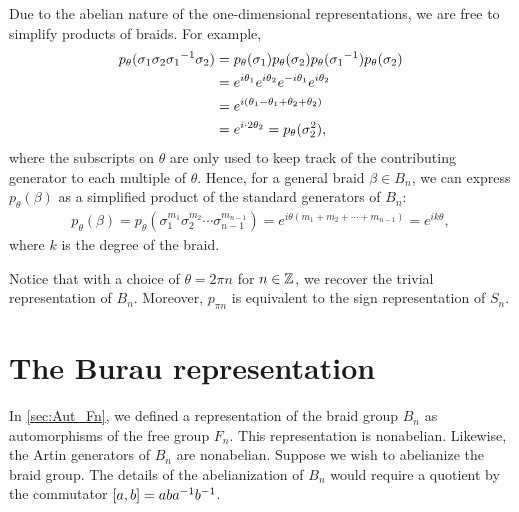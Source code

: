 Due to the abelian nature of the one-dimensional representations, we are free to simplify products of braids. For example,
\begin{align}
    \begin{split}        
    p_\theta(\sigma_1\sigma_{2}{ \sigma_1 }^{-1}\sigma_2) &= p_\theta(\sigma_1)p_\theta(\sigma_{2})p_\theta({ \sigma_1 }^{-1})p_\theta(\sigma_2) \\
    &= e^{i\theta_1}e^{i\theta_2}e^{-i\theta_{1}}e^{i\theta_2} \\
    &= e^{i\left( \theta_1-\theta_1 + \theta_2 + \theta_2 \right)} \\
    &= e^{i\cdot 2\theta_2} = p_\theta(\sigma_2^2),
    \end{split}
\end{align}
where the subscripts on $\theta$ are only used to keep track of the contributing generator to each multiple of $\theta$. Hence, for a general braid $\beta\in B_n$, we can express $p_\theta(\beta)$ as a simplified product of the standard generators of $B_n$:
\begin{align}
    p_\theta(\beta) = p_\theta(\sigma_{1}^{m_1}\sigma_{2}^{m_2}\cdots\sigma_{n-1}^{m_{n-1}}) = e^{i\theta(m_1+m_2+\cdots+m_{n-1})} = e^{ik\theta},
\end{align}
where $k$ is the degree of the braid.

Notice that with a choice of $\theta=2\pi n$ for $n\in\mathbb{Z}$, we recover the trivial representation of $B_n$. Moreover, $p_{\pi n}$ is equivalent to the sign representation of $S_n$.


\section{The Burau representation}
In \cref{sec:Aut_Fn}, we defined a representation of the braid group $B_n$ as automorphisms of the free group $F_n$. This representation is nonabelian. Likewise, the Artin generators of $B_n$ are nonabelian. Suppose we wish to abelianize the braid group. The details of the abelianization of $B_n$ would require a quotient by the commutator $\left[ a,b \right]=ab{ a }^{-1}{ b }^{-1}$.


